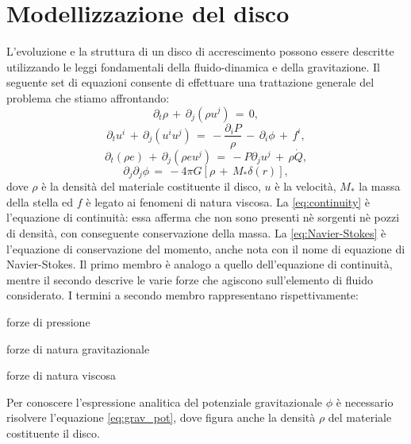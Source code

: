 \section{Modellizzazione del disco} \label{sec:mod_disc}
L'evoluzione e la struttura di un disco di accrescimento possono essere descritte utilizzando le leggi fondamentali della fluido-dinamica e della gravitazione.
Il seguente set di equazioni consente di effettuare una trattazione generale del problema che stiamo affrontando:
\begin{equation}
\partial_t \rho\,+\,\partial_j\left(\rho u^j\right)\,=\,0,
\label{eq:continuity}
\end{equation}
\begin{equation}
\partial_tu^i\,+\,\partial_j\left(u^i u^j\right)\,=\,-\frac{\partial_iP}{\rho}\,-\,\partial_i\phi\,+\,f^i,
\label{eq:Navier-Stokes}
\end{equation}
\begin{equation}
\partial_t\left(\rho e\right)\,+\,\partial_j\left(\rho e u^j\right)\,=\,-P\partial_ju^j\,+\,\rho\dot{Q},
\label{eq:energy_cons}
\end{equation}
\begin{equation}
\partial_j\partial_j\phi\,=\,-4\pi G\left[\rho\,+\,M_\ast\delta\left(r\right)\right],
\label{eq:grav_pot}
\end{equation}
dove $\rho$ è la densità del materiale costituente il disco, $u$ è la velocità, $M_\ast$ la massa della stella ed $f$ è legato ai fenomeni di natura viscosa.
La \eqref{eq:continuity} è l'equazione di continuità: essa afferma che non sono presenti nè sorgenti nè pozzi di densità, con conseguente conservazione della massa. La \eqref{eq:Navier-Stokes} è l'equazione di conservazione del momento, anche nota con il nome di equazione di Navier-Stokes. Il primo membro è analogo a quello dell'equazione di continuità, mentre il secondo descrive le varie forze che agiscono sull'elemento di fluido considerato. I termini a secondo membro rappresentano rispettivamente:
\begin{list}{\textbf{-}}{\setlength{\itemsep}{0cm}}
    \item forze di pressione
    \item forze di natura gravitazionale
    \item forze di natura viscosa
\end{list}
Per conoscere l'espressione analitica del potenziale gravitazionale $\phi$ è necessario risolvere l'equazione \eqref{eq:grav_pot}, dove figura anche la densità $\rho$ del materiale costituente il disco.
